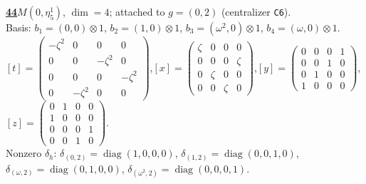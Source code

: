 \begin{samepage}\noindent\textbf{\underline{44}}\quad $M(0,\eta^{1}_{5})$, $\dim=4$; attached to $g=(0,2)$ (centralizer \texttt{C6}).\\
Basis: $b_{1}=(0,0)\otimes 1$, $b_{2}=(1,0)\otimes 1$, $b_{3}=(\omega^2,0)\otimes 1$, $b_{4}=(\omega,0)\otimes 1$.\\
$[t]=\left(\begin{smallmatrix} -\zeta^2 & 0 & 0 & 0 \\ 0 & 0 & -\zeta^2 & 0 \\ 0 & 0 & 0 & -\zeta^2 \\ 0 & -\zeta^2 & 0 & 0 \end{smallmatrix}\right)$,\quad $[x]=\left(\begin{smallmatrix} \zeta & 0 & 0 & 0 \\ 0 & 0 & 0 & \zeta \\ 0 & \zeta & 0 & 0 \\ 0 & 0 & \zeta & 0 \end{smallmatrix}\right)$,\quad $[y]=\left(\begin{smallmatrix} 0 & 0 & 0 & 1 \\ 0 & 0 & 1 & 0 \\ 0 & 1 & 0 & 0 \\ 1 & 0 & 0 & 0 \end{smallmatrix}\right)$,\quad $[z]=\left(\begin{smallmatrix} 0 & 1 & 0 & 0 \\ 1 & 0 & 0 & 0 \\ 0 & 0 & 0 & 1 \\ 0 & 0 & 1 & 0 \end{smallmatrix}\right)$.\\
Nonzero $\delta_h$: $\delta_{(0,2)}=\operatorname{diag}(1,0,0,0)$, $\delta_{(1,2)}=\operatorname{diag}(0,0,1,0)$, $\delta_{(\omega,2)}=\operatorname{diag}(0,1,0,0)$, $\delta_{(\omega^2,2)}=\operatorname{diag}(0,0,0,1)$.\end{samepage}
\medskip


